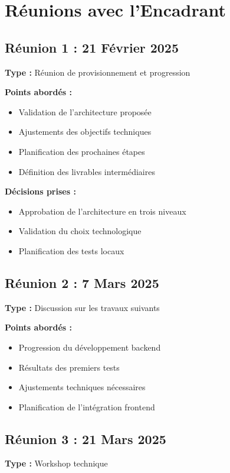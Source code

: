 \documentclass[12pt,a4paper]{article}
\begin{document}

\section{Réunions avec l'Encadrant}

\subsection{Réunion 1 : 21 Février 2025}
\textbf{Type :} Réunion de provisionnement et progression

\textbf{Points abordés :}
\begin{itemize}
    \item Validation de l'architecture proposée
    \item Ajustements des objectifs techniques
    \item Planification des prochaines étapes
    \item Définition des livrables intermédiaires
\end{itemize}

\textbf{Décisions prises :}
\begin{itemize}
    \item Approbation de l'architecture en trois niveaux
    \item Validation du choix technologique
    \item Planification des tests locaux
\end{itemize}

\subsection{Réunion 2 : 7 Mars 2025}
\textbf{Type :} Discussion sur les travaux suivants

\textbf{Points abordés :}
\begin{itemize}
    \item Progression du développement backend
    \item Résultats des premiers tests
    \item Ajustements techniques nécessaires
    \item Planification de l'intégration frontend
\end{itemize}

\subsection{Réunion 3 : 21 Mars 2025}
\textbf{Type :} Workshop technique
\end{document}
